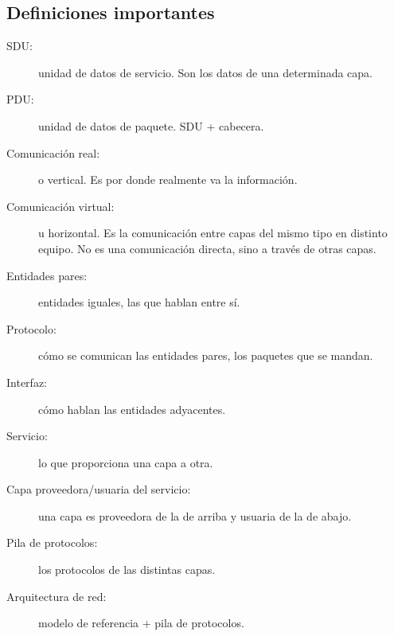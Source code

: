 \subsection{Definiciones importantes}
\begin{description}
    \item [SDU:] unidad de datos de servicio. Son los datos de una determinada capa. 
    \item [PDU:] unidad de datos de paquete. SDU + cabecera. 
    \item [Comunicación real:] o vertical. Es por donde realmente va la información. 
    \item [Comunicación virtual:] u horizontal. Es la comunicación entre capas del mismo tipo en distinto equipo. No es una comunicación directa, sino a través de otras capas. 
    \item [Entidades pares:] entidades iguales, las que hablan entre sí. 
    \item [Protocolo:] cómo se comunican las entidades pares, los paquetes que se mandan.
    \item [Interfaz:] cómo hablan las entidades adyacentes. 
    \item [Servicio:] lo que proporciona una capa a otra. 
    \item [Capa proveedora/usuaria del servicio:] una capa es proveedora de la de arriba y usuaria de la de abajo. 
    \item [Pila de protocolos:] los protocolos de las distintas capas.
    \item [Arquitectura de red:] modelo de referencia + pila de protocolos.
\end{description}

